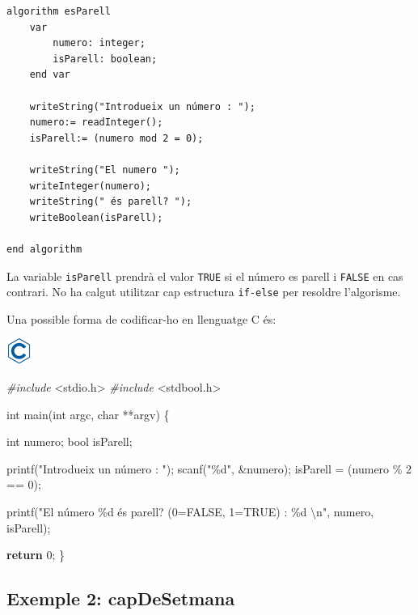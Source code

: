 \documentclass[]{book}
\newenvironment{Shaded}{\begin{snugshade}}{\end{snugshade}}
\newcommand{\ControlFlowTok}[1]{\textcolor[rgb]{0.13,0.29,0.53}{\textbf{#1}}}
\newcommand{\DataTypeTok}[1]{\textcolor[rgb]{0.13,0.29,0.53}{#1}}
\newcommand{\DecValTok}[1]{\textcolor[rgb]{0.00,0.00,0.81}{#1}}
\newcommand{\ImportTok}[1]{#1}
\newcommand{\NormalTok}[1]{#1}
\newcommand{\PreprocessorTok}[1]{\textcolor[rgb]{0.56,0.35,0.01}{\textit{#1}}}
\newcommand{\SpecialCharTok}[1]{\textcolor[rgb]{0.00,0.00,0.00}{#1}}
\newcommand{\StringTok}[1]{\textcolor[rgb]{0.31,0.60,0.02}{#1}}
\begin{document}
\begin{verbatim}
algorithm esParell
    var
        numero: integer;
        isParell: boolean;
    end var

    writeString("Introdueix un número : ");
    numero:= readInteger();
    isParell:= (numero mod 2 = 0);
    
    writeString("El numero ");
    writeInteger(numero);
    writeString(" és parell? ");
    writeBoolean(isParell);

end algorithm
\end{verbatim}

La variable \texttt{isParell} prendrà el valor \texttt{TRUE} si el número es parell i \texttt{FALSE} en cas contrari. No ha calgut utilitzar cap estructura \texttt{if-else} per resoldre l'algorisme.

Una possible forma de codificar-ho en llenguatge C és:

\includegraphics{./img/c.png}

\begin{Shaded}
\begin{Highlighting}[]
\PreprocessorTok{\#include }\ImportTok{\textless{}stdio.h\textgreater{}}
\PreprocessorTok{\#include }\ImportTok{\textless{}stdbool.h\textgreater{}}

\DataTypeTok{int}\NormalTok{ main(}\DataTypeTok{int}\NormalTok{ argc, }\DataTypeTok{char}\NormalTok{ **argv) \{}

    \DataTypeTok{int}\NormalTok{ numero;}
    \DataTypeTok{bool}\NormalTok{ isParell;}

\NormalTok{    printf(}\StringTok{"Introdueix un número : "}\NormalTok{);}
\NormalTok{    scanf(}\StringTok{"\%d"}\NormalTok{, \&numero);}
\NormalTok{    isParell = (numero \% }\DecValTok{2}\NormalTok{ == }\DecValTok{0}\NormalTok{);}
    
\NormalTok{    printf(}\StringTok{"El número \%d és parell? (0=FALSE, 1=TRUE) : \%d }\SpecialCharTok{\textbackslash{}n}\StringTok{"}\NormalTok{, numero, isParell);}

    \ControlFlowTok{return} \DecValTok{0}\NormalTok{;}
\NormalTok{\}}
\end{Highlighting}
\end{Shaded}

\hypertarget{exemple-2-capdesetmana}{%
\subsection{Exemple 2: capDeSetmana}\label{exemple-2-capdesetmana}}
\end{document}
